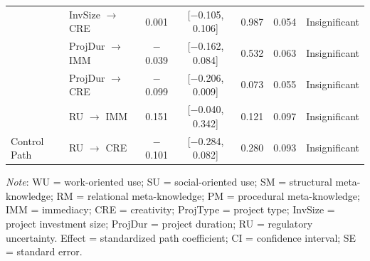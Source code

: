 \documentclass[authoryear,preprint,review,times,10pt]{elsarticle}
\begin{document}
\begin{table}[!htbp]
\begin{threeparttable}
\begin{tabular*}{0.9\textwidth}{@{\extracolsep{\fill}}llccccc}
 & InvSize $\rightarrow$ CRE  & 0.001   & [$-$0.105, 0.106] & 0.987 & 0.054 & Insignificant \\
 & ProjDur $\rightarrow$ IMM  & $-$0.039 & [$-$0.162, 0.084] & 0.532 & 0.063 & Insignificant \\
 & ProjDur $\rightarrow$ CRE  & $-$0.099 & [$-$0.206, 0.009] & 0.073 & 0.055 & Insignificant \\
 & RU $\rightarrow$ IMM       & 0.151  & [$-$0.040, 0.342] & 0.121 & 0.097 & Insignificant \\
\multirow{-8}{*}{Control Path} & RU $\rightarrow$ CRE & $-$0.101 & [$-$0.284, 0.082] & 0.280 & 0.093 & Insignificant \\
\bottomrule
\end{tabular*}
\begin{tablenotes}[flushleft]
\small\linespread{1}\selectfont
\item \textit{Note}: WU = work-oriented use; SU = social-oriented use; SM = structural meta-knowledge; RM = relational meta-knowledge; PM = procedural meta-knowledge; IMM = immediacy; CRE = creativity; ProjType = project type; InvSize = project investment size; ProjDur = project duration; RU = regulatory uncertainty. Effect = standardized path coefficient; CI = confidence interval; SE = standard error.
\end{tablenotes}
\end{threeparttable}
\end{table}
\end{document}
